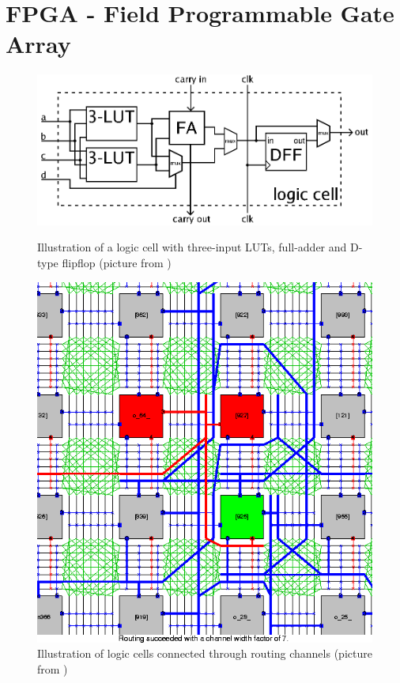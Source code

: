 \documentclass[a4paper, landscape, twocolumn, 11pt]{article}
\begin{document}
\section*{FPGA - Field Programmable Gate Array}

\begin{figure}
    \centering
    \vspace{20pt}
    \includegraphics[width=1.0\linewidth]{fig/FPGA_cell_example.png}
    \caption{Illustration of a logic cell with three-input LUTs, full-adder and 
        D-type flipflop (picture from \protect\cite{wiki:fpga})}
    \label{fig:logic_cell}
    \vspace{20pt}
    \includegraphics[width=1.0\linewidth, trim=0 10 0 0, clip=true]{fig/rr_graph.png}
    \caption{Illustration of logic cells connected through routing channels 
        (picture from \protect\cite{betz:fpga_arch})}
    \label{fig:logic_cell}
    \vspace{-1000pt}
\end{figure}
\end{document}
